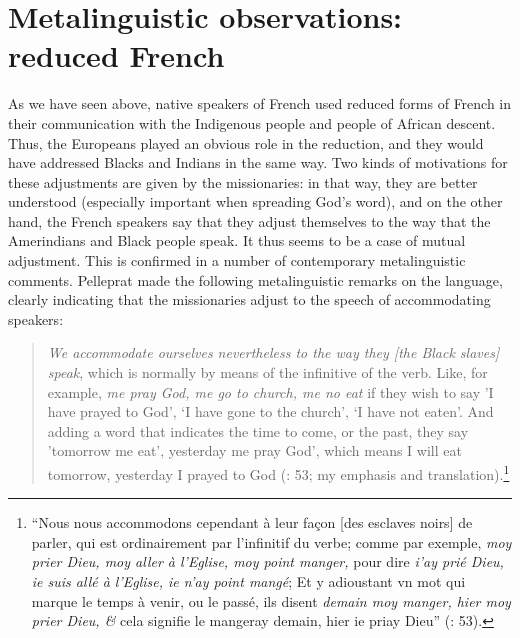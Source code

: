\documentclass[output=paper,colorlinks,citecolor=brown]{langscibook}
\begin{document}
\section{Metalinguistic observations: reduced French}
As we have seen above, native speakers of French used reduced forms of French in their communication with the Indigenous people and people of African descent. Thus, the Europeans played an obvious role in the reduction, and they would have addressed Blacks and Indians in the same way.
Two kinds of motivations for these adjustments are given by the missionaries: in that way, they are better understood (especially important when spreading God’s word), and on the other hand, the French speakers say that they adjust themselves to the way that the Amerindians and Black people speak. It thus seems to be a case of mutual adjustment. This is confirmed in a number of contemporary metalinguistic comments.
Pelleprat made the following metalinguistic remarks on the language, clearly indicating that the missionaries adjust to the speech of accommodating speakers:

\begin{quote}
\textit{We accommodate ourselves nevertheless to the way they [the Black slaves] }\textit{speak}, which is normally by means of the infinitive of the verb. Like, for example, \textit{me pray God, me go to church, me no eat }if they wish to say 'I have prayed to God', ‘I have gone to the church’, ‘I have not eaten’. And adding a word that indicates the time to come, or the past, they say 'tomorrow me eat’, yesterday me pray God', which means I will eat tomorrow, yesterday I prayed to God (\citealt{Pelleprat1655}: 53; my emphasis and translation).\footnote{“{Nous
   nous accommodons cependant à leur façon [des esclaves noirs] de parler, qui est ordinairement par l’infinitif du verbe; comme par exemple, }{\textit{moy prier Dieu, moy aller à l’Eglise, moy point manger, }}{pour dire }{\textit{i’ay prié Dieu, ie suis allé à l’Eglise, ie n’ay point mangé}}{;}{\textit{ }}{Et y adioustant vn mot qui marque le temps à venir, ou le passé, ils disent }{\textit{demain moy manger, hier moy prier Dieu, \& }}{cela signifie le mangeray demain, hier ie priay Dieu” (\citealt{Pelleprat1655}: 53).}}
\end{quote}
 
\end{document}
